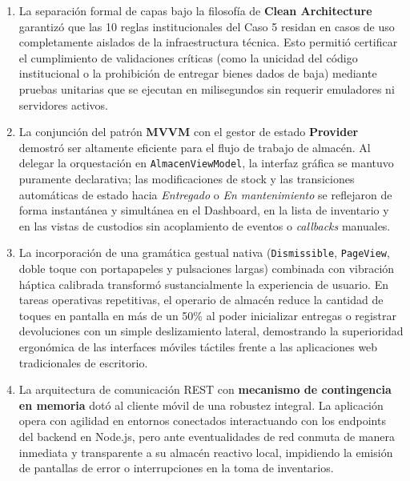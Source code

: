 \documentclass[12pt,a4paper]{article}
\begin{document}
\begin{enumerate}
    \item La separación formal de capas bajo la filosofía de \textbf{Clean Architecture} garantizó que las 10 reglas institucionales del Caso 5 residan en casos de uso completamente aislados de la infraestructura técnica. Esto permitió certificar el cumplimiento de validaciones críticas (como la unicidad del código institucional o la prohibición de entregar bienes dados de baja) mediante pruebas unitarias que se ejecutan en milisegundos sin requerir emuladores ni servidores activos.
    \item La conjunción del patrón \textbf{MVVM} con el gestor de estado \textbf{Provider} demostró ser altamente eficiente para el flujo de trabajo de almacén. Al delegar la orquestación en \texttt{AlmacenViewModel}, la interfaz gráfica se mantuvo puramente declarativa; las modificaciones de stock y las transiciones automáticas de estado hacia \textit{Entregado} o \textit{En mantenimiento} se reflejaron de forma instantánea y simultánea en el Dashboard, en la lista de inventario y en las vistas de custodios sin acoplamiento de eventos o \textit{callbacks} manuales.
    \item La incorporación de una gramática gestual nativa (\texttt{Dismissible}, \texttt{PageView}, doble toque con portapapeles y pulsaciones largas) combinada con vibración háptica calibrada transformó sustancialmente la experiencia de usuario. En tareas operativas repetitivas, el operario de almacén reduce la cantidad de toques en pantalla en más de un 50\% al poder inicializar entregas o registrar devoluciones con un simple deslizamiento lateral, demostrando la superioridad ergonómica de las interfaces móviles táctiles frente a las aplicaciones web tradicionales de escritorio.
    \item La arquitectura de comunicación REST con \textbf{mecanismo de contingencia en memoria} dotó al cliente móvil de una robustez integral. La aplicación opera con agilidad en entornos conectados interactuando con los endpoints del backend en Node.js, pero ante eventualidades de red conmuta de manera inmediata y transparente a su almacén reactivo local, impidiendo la emisión de pantallas de error o interrupciones en la toma de inventarios.
\end{enumerate}

\end{document}
